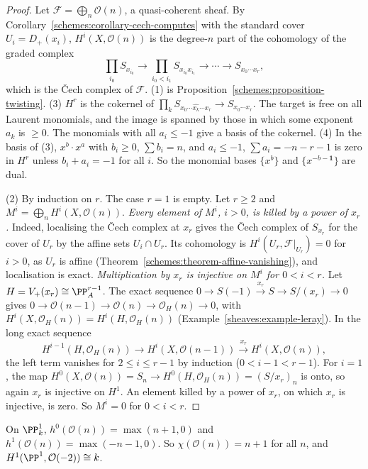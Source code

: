 \begin{proof}
Let $\mathcal{F} = \bigoplus_n\mathcal{O}(n)$, a quasi-coherent sheaf. By Corollary~\ref{schemes:corollary-cech-computes} with the standard cover
$U_i = D_+(x_i)$, $H^i(X, \mathcal{O}(n))$ is the degree-$n$ part of the cohomology of the graded complex
\[
\prod_{i_0}S_{x_{i_0}} \to \prod_{i_0 < i_1}S_{x_{i_0}x_{i_1}} \to \cdots \to S_{x_0 \cdots x_r},
\]
which is the \v{C}ech complex of $\mathcal{F}$. (1) is Proposition~\ref{schemes:proposition-twisting}. (3) $H^r$ is the cokernel of $\prod_kS_{x_0 \cdots \widehat{x_k} \cdots x_r} \to S_{x_0 \cdots x_r}$. The
target is free on all Laurent monomials, and the image is spanned by those in which some exponent $a_k$ is $\geq 0$. The monomials with all $a_i \leq -1$ give a
basis of the cokernel. (4) In the basis of (3), $x^b \cdot x^{a}$ with $b_i \geq 0$, $\sum b_i = n$, and $a_i \leq -1$, $\sum a_i = -n-r-1$ is zero in $H^r$ unless
$b_i + a_i = -1$ for all $i$. So the monomial bases $\{x^b\}$ and $\{x^{-b-\mathbf{1}}\}$ are dual.

(2) By induction on $r$. The case $r = 1$ is empty. Let $r \geq 2$ and $M^i = \bigoplus_nH^i(X, \mathcal{O}(n))$. \emph{Every element of $M^i$, $i > 0$, is killed by a power of
$x_r$.} Indeed, localising the \v{C}ech complex at $x_r$ gives the \v{C}ech complex of $S_{x_r}$ for the cover of $U_r$ by the affine sets $U_i \cap U_r$. Its
cohomology is $H^i(U_r, \mathcal{F}|_{U_r}) = 0$ for $i > 0$, as $U_r$ is affine (Theorem~\ref{schemes:theorem-affine-vanishing}), and localisation is exact.
\emph{Multiplication by $x_r$ is injective on $M^i$ for $0 < i < r$.} Let $H = V_+(x_r) \cong \PP^{r-1}_A$. The exact sequence
$0 \to S(-1) \xrightarrow{x_r} S \to S/(x_r) \to 0$ gives $0 \to \mathcal{O}(n-1) \to \mathcal{O}(n) \to \mathcal{O}_H(n) \to 0$, with $H^i(X, \mathcal{O}_H(n)) = H^i(H, \mathcal{O}_H(n))$
(Example~\ref{sheaves:example-leray}). In the long exact sequence
\[
H^{i-1}(H, \mathcal{O}_H(n)) \to H^i(X, \mathcal{O}(n-1)) \xrightarrow{x_r} H^i(X, \mathcal{O}(n)),
\]
the left term vanishes for $2 \leq i \leq r - 1$ by induction ($0 < i - 1 < r - 1$). For $i = 1$, the map $H^0(X, \mathcal{O}(n)) = S_n \to H^0(H, \mathcal{O}_H(n)) = (S/x_r)_n$ is
onto, so again $x_r$ is injective on $H^1$. An element killed by a power of $x_r$, on which $x_r$ is injective, is zero. So $M^i = 0$ for $0 < i < r$.
\end{proof}

\begin{corollary}\label{schemes:corollary-p1}
On $\PP^1_k$, $h^0(\mathcal{O}(n)) = \max(n + 1, 0)$ and $h^1(\mathcal{O}(n)) = \max(-n - 1, 0)$. So $\chi(\mathcal{O}(n)) = n + 1$ for all $n$, and $H^1(\PP^1, \mathcal{O}(-2)) \cong k$.
\end{corollary}


